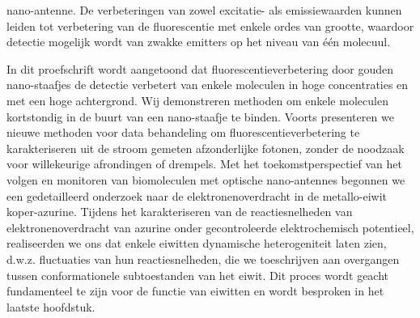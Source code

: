 nano-antenne. De verbeteringen van zowel excitatie- als emissiewaarden kunnen leiden tot verbetering van de fluorescentie met enkele ordes van grootte, waardoor detectie mogelijk wordt van zwakke emitters op het niveau van één molecuul.


In dit proefschrift wordt aangetoond dat fluorescentieverbetering door gouden nano-staafjes de detectie verbetert van enkele moleculen in hoge concentraties en met een hoge achtergrond. Wij demonstreren methoden om enkele moleculen kortstondig in de buurt van een nano-staafje te binden. Voorts presenteren we nieuwe methoden voor data behandeling om fluorescentieverbetering te karakteriseren uit de stroom gemeten afzonderlijke fotonen, zonder de noodzaak voor willekeurige afrondingen of drempels. Met het toekomstperspectief van het volgen en monitoren van biomoleculen met optische nano-antennes begonnen we een gedetailleerd onderzoek naar de elektronenoverdracht in de metallo-eiwit koper-azurine. Tijdens het karakteriseren van de reactiesnelheden van elektronenoverdracht van azurine onder gecontroleerde elektrochemisch potentieel, realiseerden we ons dat enkele eiwitten dynamische heterogeniteit laten zien, d.w.z. fluctuaties van hun reactiesnelheden, die we toeschrijven aan overgangen tussen conformationele subtoestanden van het eiwit. Dit proces wordt geacht fundamenteel te zijn voor de functie van eiwitten en wordt besproken in het laatste hoofdstuk.


